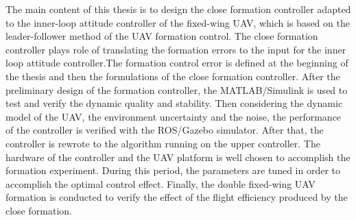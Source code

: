 \begin{englishabstract}

The main content of this thesis is to design the close formation controller adapted to the inner-loop attitude controller of the fixed-wing UAV, which is based on the leader-follower method of the UAV formation control. The close formation controller plays role of translating the formation errors to the input for the inner loop attitude controller.The formation control error is defined at the beginning of the thesis and then the formulations of the close formation controller. After the preliminary design of the formation controller, the MATLAB/Simulink is used to test and verify the dynamic quality and stability. Then considering the dynamic model of the  UAV, the environment uncertainty and the noise, the performance of the controller is verified with the ROS/Gazebo simulator. After that, the controller is rewrote to the algorithm running on the upper controller. The hardware of the controller and the UAV platform is well chosen to accomplish the formation experiment. During this period, the parameters are tuned in order to accomplish the optimal control effect.
Finally, the double fixed-wing UAV formation is conducted to verify the effect of the flight efficiency produced by the close formation.
   

\end{englishabstract}
